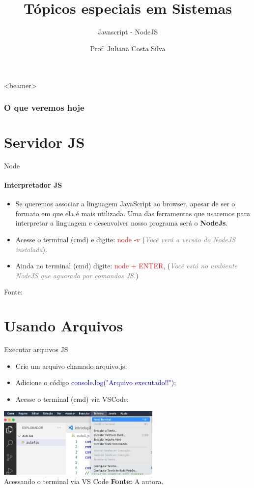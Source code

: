 \documentclass{beamer}
\title{Tópicos especiais em Sistemas}
\subtitle{Javascript - NodeJS}
\author{Prof. Juliana Costa Silva}
\begin{document}
  \frame[c]{\maketitle}
    \begin{frame}<beamer>
      \frametitle{O que veremos hoje}
      \tableofcontents
    \end{frame}
    \section{Servidor JS}
    \begin{frame}{Node}
      \framesubtitle{Interpretador JS}%
      
      \begin{itemize}
            \item Se queremos associar a linguagem JavaScript ao browser, apesar de ser o formato em que ela é mais utilizada. Uma das ferramentas que usaremos para interpretar a linguagem e desenvolver nosso programa será o \textbf{NodeJs}.
            \item Acesse o terminal (cmd) e digite:  \textcolor{red}{node -v} (\textcolor{gray}{\textit{Você verá a versão do NodeJS instalada}}).
            \item Ainda no terminal (cmd) digite:  \textcolor{red}{node + ENTER}, (\textcolor{gray}{\textit{Você está no ambiente NodeJS que aguarada por comandos JS.}})
       \end{itemize}
       \tiny{Fonte: \cite{nodejs2022api}}
     \end{frame}
\section{Usando Arquivos}
\begin{frame}{Executar arquivos JS}

    \begin{itemize}
        \item Crie um arquivo chamado arquivo.js;
        \item Adicione o código \textcolor{blue}{console.log("Arquivo executado!!")};
        \item Acesse o terminal (cmd) via VSCode:  
    \end{itemize}
    \centering
	\includegraphics[width=80mm]{aulas/resources/aula_js_4_1.png}\\
            \tiny{ Acessando o terminal via VS Code \textbf{Fonte:} A autora.}
\end{frame}
\end{document}
